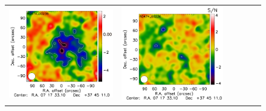 \documentclass[twocolumn,traditabstract]{aa}
\begin{document}
\begin{figure}[h]
{\begin{tabular}{llllll}
\includegraphics[trim=2.3cm 0.7cm 0cm 0cm, clip=true, scale=1]{Figure/Map_RG474_00236_Ymap_zobs0p4_processed_deconv.pdf} & 
\includegraphics[trim=2.3cm 0.7cm 0cm 0cm, clip=true, scale=1]{Figure/Map_RG474_00236_Ymap_zobs0p4_diff.pdf} & 

\end{tabular}}
\end{figure}
\end{document}
